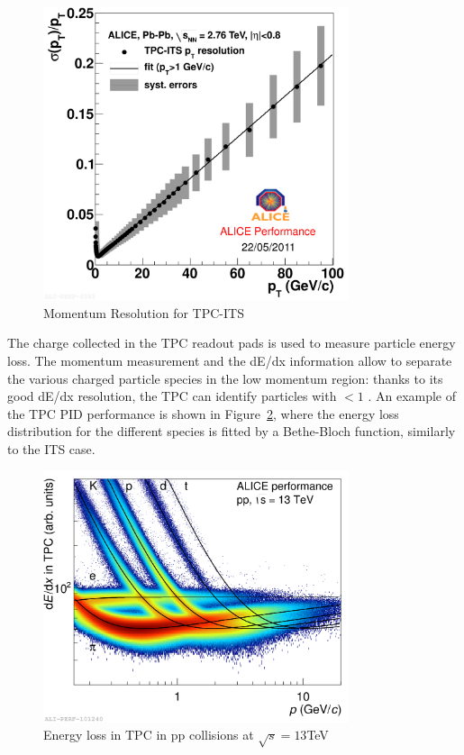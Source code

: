 \begin{figure}[t]
\centering
\includegraphics[width=0.8\textwidth]{Images/Chapter3/tpcits_perf}
\caption[Momentum resolution for TPC-ITS]{Momentum Resolution for TPC-ITS}
\label{Fig:cap3-1.6}
\end{figure}



The charge collected in the TPC readout pads is used to measure particle energy loss. The momentum measurement and the dE/dx information allow to separate the various charged particle species in the low momentum region: thanks to its good dE/dx resolution, the TPC can identify particles with \pT$<1$ \GeVc. An example of the TPC PID performance is shown in \mbox{Figure \ref{Fig:cap3-1.7}}, where the energy loss distribution for the different species is fitted by a Bethe-Bloch function, similarly to the ITS case.

\begin{figure}[t]
\centering
\includegraphics[width=0.8\textwidth]{Images/Chapter3/tpc_dEdx_13TeV}
\caption[Energy loss in TPC in pp collisions at $\sqrt{s} = 13$TeV]{Energy loss in TPC in pp collisions at $\sqrt{s} = 13$TeV}
\label{Fig:cap3-1.7}
\end{figure}



